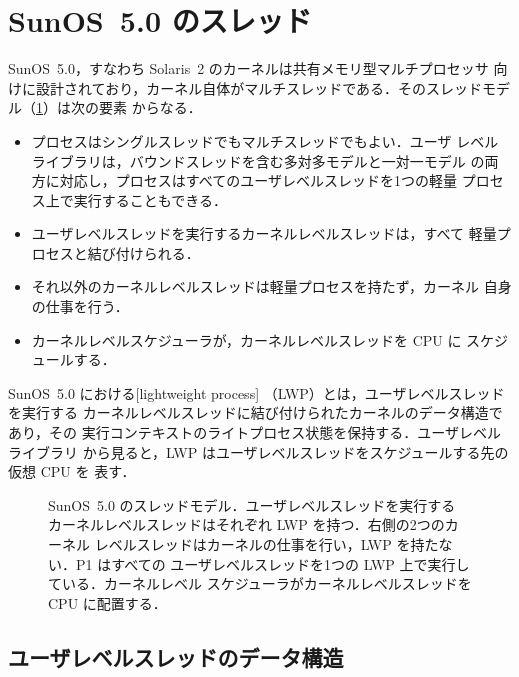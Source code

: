\documentclass[../main.tex]{subfiles}
\begin{document}
\section{SunOS~5.0 のスレッド}
\label{sec:l05-solaris}

SunOS~5.0，すなわち Solaris~2 のカーネルは共有メモリ型マルチプロセッサ
向けに設計されており，カーネル自体がマルチスレッドである．そのスレッドモデル（\cref{fig:l05-sunos}）は次の要素
からなる．
\begin{itemize}
  \item プロセスはシングルスレッドでもマルチスレッドでもよい．ユーザ
    レベルライブラリは，バウンドスレッドを含む多対多モデルと一対一モデル
    の両方に対応し，プロセスはすべてのユーザレベルスレッドを1つの軽量
    プロセス上で実行することもできる．
  \item ユーザレベルスレッドを実行するカーネルレベルスレッドは，すべて
    軽量プロセスと結び付けられる．
  \item それ以外のカーネルレベルスレッドは軽量プロセスを持たず，カーネル
    自身の仕事を行う．
  \item カーネルレベルスケジューラが，カーネルレベルスレッドを CPU に
    スケジュールする．
\end{itemize}

\begin{definition}[軽量プロセス]
  SunOS~5.0 における[lightweight process]%
  （LWP）とは，ユーザレベルスレッドを実行する
  カーネルレベルスレッドに結び付けられたカーネルのデータ構造であり，その
  実行コンテキストのライトプロセス状態を保持する．ユーザレベルライブラリ
  から見ると，LWP はユーザレベルスレッドをスケジュールする先の仮想 CPU を
  表す．
\end{definition}

\begin{figure}[htbp]
  \centering
  
  \caption{SunOS~5.0 のスレッドモデル．ユーザレベルスレッドを実行する
    カーネルレベルスレッドはそれぞれ LWP を持つ．右側の2つのカーネル
    レベルスレッドはカーネルの仕事を行い，LWP を持たない．P1 はすべての
    ユーザレベルスレッドを1つの LWP 上で実行している．カーネルレベル
    スケジューラがカーネルレベルスレッドを CPU に配置する．}
  \label{fig:l05-sunos}
\end{figure}

\subsection{ユーザレベルスレッドのデータ構造}
\end{document}
